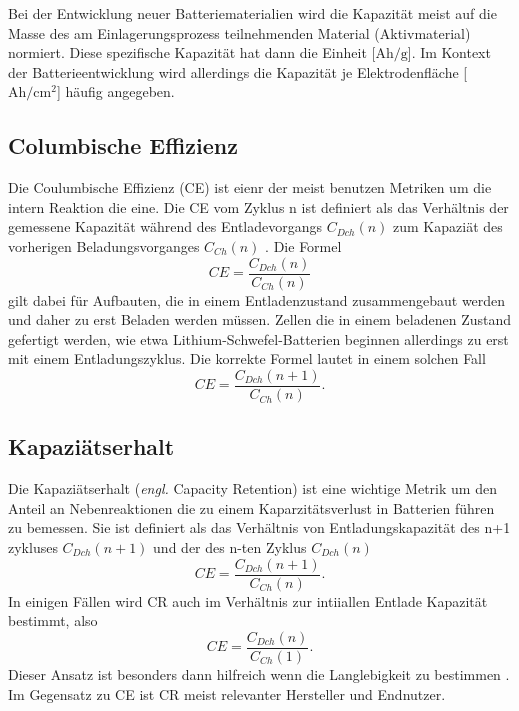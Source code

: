 Bei der Entwicklung neuer Batteriematerialien wird die Kapazität meist auf die Masse des am Einlagerungsprozess teilnehmenden Material (Aktivmaterial) normiert. Diese spezifische Kapazität hat dann die Einheit [$\si{\A \hour \per \g}$]. Im Kontext der Batterieentwicklung wird allerdings die Kapazität je Elektrodenfläche [$\si{\A \hour \per \cm \squared}$] häufig angegeben.


\subsection{Columbische Effizienz}
Die Coulumbische Effizienz (CE) ist eienr der meist benutzen Metriken um die intern Reaktion die eine. Die CE vom Zyklus n ist definiert als das Verhältnis der gemessene Kapazität während des Entladevorgangs $C_{Dch}(n)$ zum Kapaziät des vorherigen Beladungsvorganges $C_{Ch}(n)$ \cite{Tornheim2020}.
Die Formel
\begin{equation}
CE = \frac{C_{Dch}(n)}{C_{Ch}(n)}
\end{equation}
gilt dabei für Aufbauten, die in einem Entladenzustand zusammengebaut werden und daher zu erst Beladen werden müssen. Zellen die in einem beladenen Zustand gefertigt werden, wie etwa Lithium-Schwefel-Batterien beginnen allerdings zu erst mit einem Entladungszyklus. Die korrekte Formel lautet in einem solchen Fall
\begin{equation}
    CE = \frac{C_{Dch}(n+1)}{C_{Ch}(n)}.
\end{equation}

\subsection{Kapaziätserhalt}
Die Kapaziätserhalt (\textit{engl.} Capacity Retention) ist eine wichtige Metrik um den Anteil an Nebenreaktionen die zu einem Kaparzitätsverlust in Batterien führen zu bemessen. Sie ist definiert als das Verhältnis von Entladungskapazität des n+1 zykluses $C_{Dch}(n+1)$ und der des n-ten Zyklus $C_{Dch}(n)$ 
\begin{equation}
    CE = \frac{C_{Dch}(n+1)}{C_{Ch}(n)}.
\end{equation}
In einigen Fällen wird CR auch im Verhältnis zur intiiallen Entlade Kapazität bestimmt, also
\begin{equation}
    CE = \frac{C_{Dch}(n)}{C_{Ch}(1)}.
\end{equation}
Dieser Ansatz ist besonders dann hilfreich wenn die Langlebigkeit zu bestimmen \cite{Tornheim2020}.
Im Gegensatz zu CE ist CR meist relevanter Hersteller und Endnutzer.



